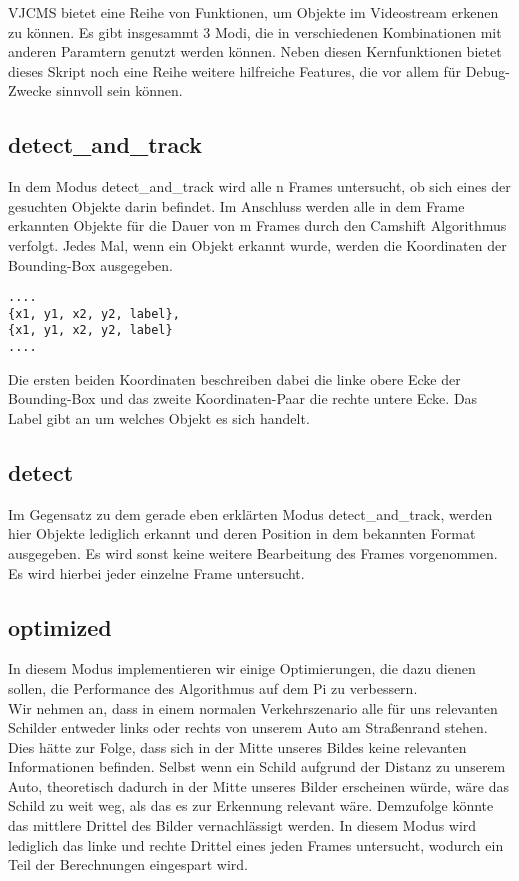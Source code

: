 VJCMS bietet eine Reihe von Funktionen, um Objekte im Videostream erkenen zu können. Es gibt insgesammt 3 Modi, die in verschiedenen Kombinationen mit anderen Paramtern genutzt werden können. Neben diesen Kernfunktionen bietet dieses Skript noch eine Reihe weitere hilfreiche Features, die vor allem für Debug-Zwecke sinnvoll sein können.
\subsection{detect\_and\_track}
In dem Modus detect\_and\_track wird alle n Frames untersucht, ob sich eines der gesuchten Objekte darin befindet. Im Anschluss werden alle in dem Frame erkannten Objekte für die Dauer von m Frames durch den Camshift Algorithmus verfolgt. Jedes Mal, wenn ein Objekt erkannt wurde, werden die Koordinaten der Bounding-Box ausgegeben.

\begin{lstlisting}[caption={Aufbau des Ergebnis-Array}]
....
{x1, y1, x2, y2, label},
{x1, y1, x2, y2, label}
....

\end{lstlisting}

Die ersten beiden Koordinaten beschreiben dabei die linke obere Ecke der Bounding-Box und das zweite Koordinaten-Paar die rechte untere Ecke. Das Label gibt an um welches Objekt es sich handelt.


\subsection{detect}
Im Gegensatz zu dem gerade eben erklärten Modus detect\_and\_track, werden hier Objekte lediglich erkannt und deren Position in dem bekannten Format ausgegeben. Es wird sonst keine weitere Bearbeitung des Frames vorgenommen. Es wird hierbei jeder einzelne Frame untersucht.

\subsection{optimized}
In diesem Modus implementieren wir einige Optimierungen, die dazu dienen sollen, die Performance des Algorithmus auf dem Pi zu verbessern.
\\
Wir nehmen an, dass in einem normalen Verkehrszenario alle für uns relevanten Schilder entweder links oder rechts von unserem Auto am Straßenrand stehen. Dies hätte zur Folge, dass sich in der Mitte unseres Bildes keine relevanten Informationen befinden. Selbst wenn ein Schild aufgrund der Distanz zu unserem Auto, theoretisch dadurch in der Mitte unseres Bilder erscheinen würde, wäre das Schild zu weit weg, als das es zur Erkennung relevant wäre.
Demzufolge könnte das mittlere Drittel des Bilder vernachlässigt werden.
In diesem Modus wird lediglich das linke und rechte Drittel eines jeden Frames untersucht, wodurch ein Teil der Berechnungen eingespart wird.

